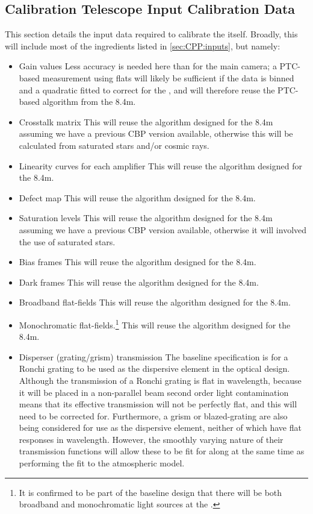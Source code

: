 

\subsection{Calibration Telescope Input Calibration Data}
\label{sec:CPP:auxTelescope:inputs}
This section details the input data required to calibrate the \auxtelescope itself. Broadly, this will include most of the ingredients listed in \secsymbol\ref{sec:CPP:inputs}, but namely:

\begin{itemize}
	\item Gain values
	\subitem Less accuracy is needed here than for the main camera; a PTC-based measurement using flats will likely be sufficient if the data is binned and a quadratic fitted to correct for the \bfeffect, and will therefore reuse the PTC-based algorithm from the 8.4m.
	\item Crosstalk matrix
	\subitem This will reuse the algorithm designed for the 8.4m assuming we have a previous CBP version available, otherwise this will be calculated from saturated stars and/or cosmic rays.
	\item Linearity curves for each amplifier
	\subitem This will reuse the algorithm designed for the 8.4m.
	\item Defect map
	\subitem This will reuse the algorithm designed for the 8.4m.
	\item Saturation levels
	\subitem This will reuse the algorithm designed for the 8.4m assuming we have a previous CBP version available, otherwise it will involved the use of saturated stars.
	\item Bias frames
	\subitem This will reuse the algorithm designed for the 8.4m.
	\item Dark frames
	\subitem This will reuse the algorithm designed for the 8.4m.
	\item Broadband flat-fields
	\subitem This will reuse the algorithm designed for the 8.4m.
	\item Monochromatic flat-fields.\footnote{ It is confirmed to be part of the baseline design that there will be both broadband and monochromatic light sources at the \auxtelescope.}
	\subitem This will reuse the algorithm designed for the 8.4m.
	\item Disperser (grating/grism) transmission
	\subitem The baseline specification is for a Ronchi grating to be used as the dispersive element in the optical design. Although the transmission of a Ronchi grating is flat in wavelength, because it will be placed in a non-parallel beam second order light contamination means that its effective transmission will not be perfectly flat, and this will need to be corrected for. Furthermore, a grism or blazed-grating are also being considered for use as the dispersive element, neither of which have flat responses in wavelength. However, the smoothly varying nature of their transmission functions will allow these to be fit for along at the same time as performing the fit to the atmospheric model.

\end{itemize}
